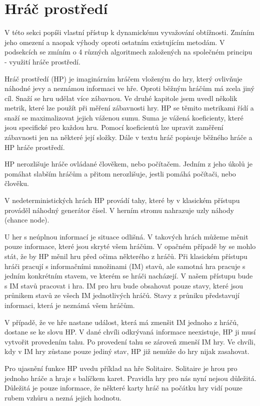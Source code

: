 \section{Hráč prostředí}

V této sekci popíši vlastní přístup k dynamickému vyvažování obtížnosti. Zmíním jeho omezení a naopak výhody oproti ostatním existujícím metodám. V podsekcích se zmíním o 4 různých algoritmech založených na společném principu - využití hráče prostředí.

Hráč prostředí (HP) je imaginárním hráčem vloženým do hry, který ovlivňuje náhodné jevy a neznámou informaci ve hře. Oproti běžným hráčům má zcela jiný cíl. Snaží se hru udělat více zábavnou. Ve druhé kapitole jsem uvedl několik metrik, které lze použít při měření zábavnosti hry. HP se těmito metrikami řídí a snaží se maximalizovat jejich váženou sumu. Suma je vážená koeficienty, které jsou specifické pro každou hru. Pomocí koeficientů lze upravit zaměření zábavnosti jen na některé její složky. Dále v textu hráč popisuje běžného hráče a HP hráče prostředí.

HP nerozlišuje hráče ovládané člověkem, nebo počítačem. Jedním z jeho úkolů je pomáhat slabším hráčům a přitom nerozlišuje, jestli pomáhá počítači, nebo člověku.

V nedeterministických hrách HP provádí tahy, které by v klasickém přístupu prováděl náhodný generátor čísel. V herním stromu nahrazuje uzly náhody (chance node). 

U her s neúplnou informací je situace odlišná. V takových hrách můžeme měnit pouze informace, které jsou skryté všem hráčům. V opačném případě by se mohlo stát, že by HP měnil hru před očima některého z hráčů. Při klasickém přístupu hráči pracují s informačními množinami (IM) stavů, ale samotná hra pracuje s jedním konkrétním stavem, ve kterém se hráči nacházejí. V našem přístupu bude s IM stavů pracovat i hra. IM pro hru bude obsahovat pouze stavy, které jsou průnikem stavů ze všech IM jednotlivých hráčů. Stavy z průniku představují informaci, která je neznámá všem hráčům. 

V případě, že ve hře nastane událost, která má zmenšit IM jednoho z hráčů, dostane se ke slovu HP. V dané chvíli odkrývaná informace neexistuje, HP ji musí vytvořit provedením tahu. Po provedení tahu se zároveň zmenší IM hry. Ve chvíli, kdy v IM hry zůstane pouze jediný stav, HP již nemůže do hry nijak zasahovat.

Pro ujasnění funkce HP uvedu příklad na hře Solitaire. Solitaire je hrou pro jednoho hráče a hraje s balíčkem karet. Pravidla hry pro nás nyní nejsou důležitá. Důležitá je pouze informace, že některé karty hráč na počátku hry vidí pouze rubem vzhůru a nezná jejich hodnotu. 

